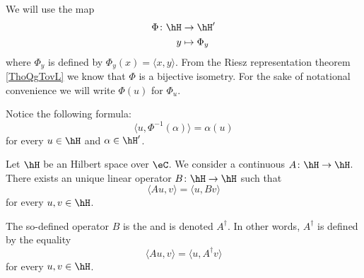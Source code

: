 We will use the map 
\begin{equation}
    \begin{aligned}
        \Phi\colon \hH&\to \hH' \\
        y&\mapsto \Phi_y 
    \end{aligned}
\end{equation}
where \( \Phi_y\) is defined by \( \Phi_y(x)=\langle x, y\rangle \). From the Riesz representation theorem \ref{ThoQgTovL} we know that \( \Phi\) is a bijective isometry. For the sake of notational convenience we will write \( \Phi(u)\) for \( \Phi_u\).

Notice the following formula:
\begin{equation}        \label{EQooHWQPooNeYokT}
    \langle u, \Phi^{-1}(\alpha)\rangle =\alpha(u)
\end{equation}
for every \( u\in \hH\) and \( \alpha\in\hH'\).

\begin{propositionDef}
    Let \( \hH\) be an Hilbert space over \( \eC\). We consider a continuous \( A\colon \hH\to \hH\). There exists an unique linear operator \( B\colon \hH\to \hH\) such that
    \begin{equation}
        \langle Au, v\rangle =\langle u, Bv\rangle 
    \end{equation}
    for every \( u,v\in \hH\).

    The so-defined operator \( B\) is the  and is denoted \( A^{\dag}\). In other words, \( A^{\dag}\) is defined by the equality
    \begin{equation}        \label{EQooPTUWooPCbNxA}
        \langle Au, v\rangle =\langle u, A^{\dag}v\rangle 
    \end{equation}
    for every \( u,v\in\hH\).
\end{propositionDef}

